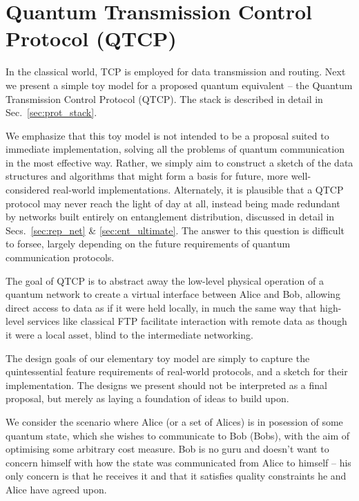 %
%

\section{Quantum Transmission Control Protocol (QTCP)} \label{sec:QTCP}

In the classical world, TCP is employed for data transmission and routing. Next we present a simple toy model for a proposed quantum equivalent -- the Quantum Transmission Control Protocol (QTCP). The stack is described in detail in Sec.~\ref{sec:prot_stack}.

We emphasize that this toy model is not intended to be a proposal suited to immediate implementation, solving all the problems of quantum communication in the most effective way. Rather, we simply aim to construct a sketch of the data structures and algorithms that might form a basis for future, more well-considered real-world implementations. Alternately, it is plausible that a QTCP protocol may never reach the light of day at all, instead being made redundant by networks built entirely on entanglement distribution, discussed in detail in Secs.~\ref{sec:rep_net} \& \ref{sec:ent_ultimate}. The answer to this question is difficult to forsee, largely depending on the future requirements of quantum communication protocols.

The goal of QTCP is to abstract away the low-level physical operation of a quantum network to create a virtual interface between Alice and Bob, allowing direct access to data as if it were held locally, in much the same way that high-level services like classical FTP facilitate interaction with remote data as though it were a local asset, blind to the intermediate networking.

The design goals of our elementary toy model are simply to capture the quintessential feature requirements of real-world protocols, and a sketch for their implementation. The designs we present should not be interpreted as a final proposal, but merely as laying a foundation of ideas to build upon.

We consider the scenario where Alice (or a set of Alices) is in posession of some quantum state, which she wishes to communicate to Bob (Bobs), with the aim of optimising some arbitrary cost measure. Bob is no guru and doesn't want to concern himself with how the state was communicated from Alice to himself -- his only concern is that he receives it and that it satisfies quality constraints he and Alice have agreed upon.

